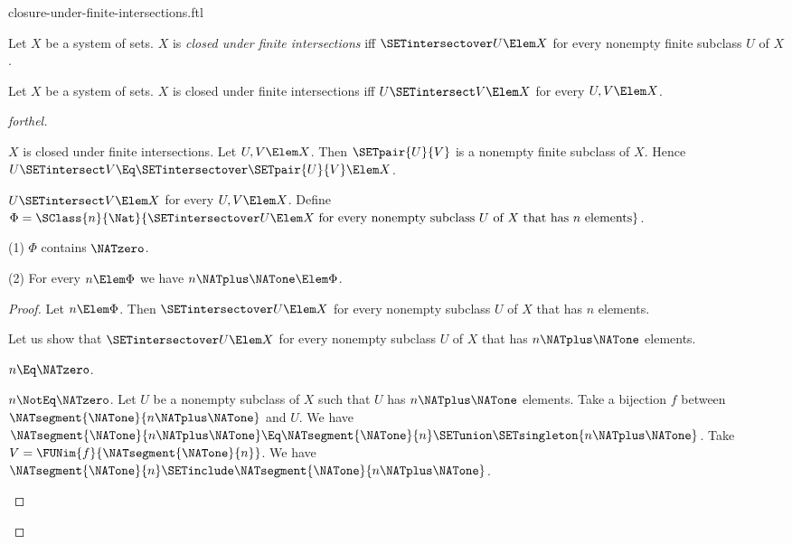 \documentclass{stex}
\begin{document}
\begin{smodule}{closure-under-finite-intersections.ftl}

\begin{definition}[forthel]
  Let $X$ be a system of sets.
  $X$ is \emph{closed under finite intersections} iff $\SETintersectover U \Elem X$ for every nonempty finite subclass $U$ of $X$.
\end{definition}

\begin{proposition}[forthel]
  Let $X$ be a system of sets.
  $X$ is closed under finite intersections iff $U \SETintersect V \Elem X$ for every $U, V \Elem X$.
\end{proposition}
\begin{proof}[forthel]
  \begin{case}{$X$ is closed under finite intersections.}
    Let $U, V \Elem X$.
    Then $\SETpair{U}{V}$ is a nonempty finite subclass of $X$.
    Hence $U \SETintersect V \Eq \SETintersectover \SETpair{U}{V} \Elem X$.
  \end{case}

  \begin{case}{$U \SETintersect V \Elem X$ for every $U, V \Elem X$.}
    Define $\Phi = \SClass{n}{\Nat}{\SETintersectover U \Elem X\text{ for every nonempty subclass }U\text{ of }X\text{ that has }n\text{ elements}}$.

    (1) $\Phi$ contains $\NATzero$.

    (2) For every $n \Elem \Phi$ we have $n \NATplus \NATone \Elem \Phi$.
    \begin{proof}
      Let $n \Elem \Phi$.
      Then $\SETintersectover U \Elem X$ for every nonempty subclass $U$ of $X$ that has $n$ elements.

      Let us show that $\SETintersectover U \Elem X$ for every nonempty subclass $U$ of $X$ that has $n \NATplus \NATone$ elements.

        \begin{case}{$n \Eq \NATzero$.} \end{case}

        \begin{case}{$n \NotEq \NATzero$.}
          Let $U$ be a nonempty subclass of $X$ such that $U$ has $n \NATplus \NATone$ elements.
          Take a bijection $f$ between $\NATsegment{\NATone}{n \NATplus \NATone}$ and $U$.
          We have $\NATsegment{\NATone}{n \NATplus \NATone} \Eq \NATsegment{\NATone}{n} \SETunion \SETsingleton{n \NATplus \NATone}$.
          Take $V = \FUNim{f}{\NATsegment{\NATone}{n}}$.
          We have $\NATsegment{\NATone}{n} \SETinclude \NATsegment{\NATone}{n \NATplus \NATone}$.


\end{case}
\end{proof}
\end{case}
\end{proof}
\end{smodule}
\end{document}
